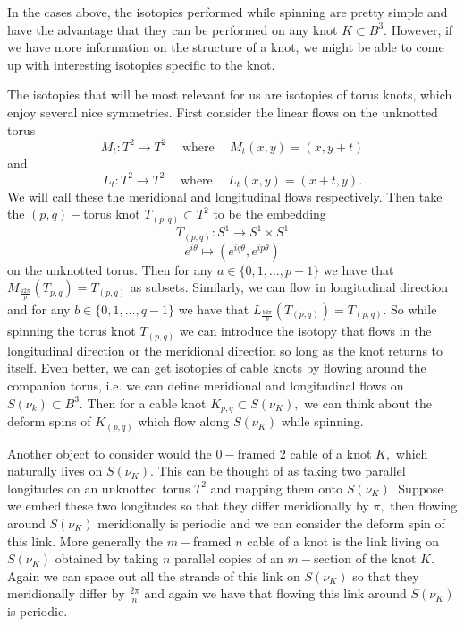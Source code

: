 \documentclass[a4paper, 12 pt, reqno]{amsart}
\theoremstyle{definition}
\theoremstyle{remark}
\begin{document}
In the cases above, the isotopies performed while spinning are pretty simple and have the advantage that they can be performed on any knot $K \subset B^{3}.$ However, if we have more information on the structure of a knot, we might be able to come up with interesting isotopies specific to the knot. 

The isotopies that will be most relevant for us are isotopies of torus knots, which enjoy several nice symmetries. First consider the linear flows on the unknotted torus $$M_{t}: T^{2} \rightarrow T^{2} \hspace{15pt}\text{where} \hspace{15pt} M_{t}(x,y) = (x, y + t)$$ and $$L_{t}: T^{2} \rightarrow T^{2} \hspace{15pt}\text{where} \hspace{15pt} L_{t}(x, y) = (x + t, y).$$ We will call these the meridional and longitudinal flows respectively. Then take the $(p, q)-$torus knot $T_{(p, q)} \subset T^{2}$ to be the embedding $$T_{(p,q)}: S^{1} \rightarrow S^{1} \times S^{1}$$ $$e^{i\theta} \mapsto (e^{iq\theta}, e^{ip\theta})$$ on the unknotted torus. Then for any $a \in \{0, 1, \hdots , p - 1\}$ we have that $M_{\frac{a2\pi}{p}}(T_{p,q}) = T_{(p, q)}$ as subsets. Similarly, we can flow in longitudinal direction and for any $b \in \{0, 1, \hdots , q - 1\}$  we have that $L_{\frac{b2\pi}{p}}(T_{(p, q)})= T_{(p, q)}.$ So while spinning the torus knot $T_{(p,q)}$ we can introduce the isotopy that flows in the longitudinal direction or the meridional direction so long as the knot returns to itself. Even better, we can get isotopies of cable knots by flowing around the companion torus, i.e. we can define meridional and longitudinal flows on $S(\nu_{k}) \subset B^{3}$. Then for a cable knot $K_{p, q} \subset S(\nu_{K}),$ we can think about the deform spins of $K_{(p, q)}$ which flow along $S(\nu_{K})$ while spinning.

Another object to consider would the $0-$framed 2 cable of a knot $K,$ which naturally lives on $S(\nu_{K}).$ This can be thought of as taking two parallel longitudes on an unknotted torus $T^{2}$ and mapping them onto $S(\nu_{K}).$ Suppose we embed these two longitudes so that they differ meridionally by $\pi,$ then flowing around $S(\nu_{K})$ meridionally is periodic and we can consider the deform spin of this link. More generally the $m-$framed $n$ cable of a knot is the link living on $S(\nu_{K})$ obtained by taking $n$ parallel copies of an $m-$section of the knot $K.$ Again we can space out all the strands of this link on $S(\nu_{K})$ so that they meridionally differ by $\frac{2\pi}{n}$ and again we have that flowing this link around $S(\nu_{K})$ is periodic.
\end{document}

